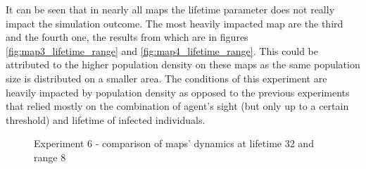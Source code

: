 It can be seen that in nearly all maps the lifetime parameter does not really impact the simulation outcome.
The most heavily impacted map are the third and the fourth one, the results from which are in figures \ref{fig:map3_lifetime_range} and \ref{fig:map4_lifetime_range}.
This could be attributed to the higher population density on these maps as the same population size is distributed on a smaller area.
The conditions of this experiment are heavily impacted by population density as opposed to the previous experiments that relied mostly on the combination of agent's sight (but only up to a certain threshold) and lifetime of infected individuals.

\begin{figure}[H]
    \centering

    \hspace*{\fill}

    \hspace*{\fill}

    \caption{Experiment 6 - comparison of maps' dynamics at lifetime 32 and range 8}\label{fig:maps_limited_range}
\end{figure}

